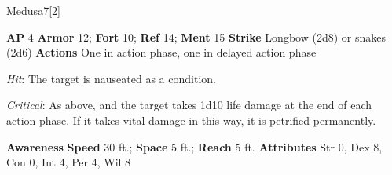 \begin{monsection}{Medusa}{7}[2]
\vspace{-1em}\vspace{-1em}
\begin{spellcontent}
\begin{spelltargetinginfo}
{\textbf{AP} 4}
\pari \textbf{Armor} 12;
\textbf{Fort} 10;
\textbf{Ref} 14;
\textbf{Ment} 15
\pari \textbf{Strike} Longbow  (2d8) or snakes  (2d6)
\pari \textbf{Actions} One in action phase, one in delayed action phase
\end{spelltargetinginfo}
\begin{spelleffects}
\pari
{}
\par
\par \textit{Hit}: The target is nauseated as a condition.
\par \textit{Critical}:
As above, and the target takes 1d10 life damage at the end of each action phase.
If it takes vital damage in this way, it is petrified permanently.
\end{spelleffects}
\end{spellcontent}
\begin{spellsubcontent}
\begin{spellfooter}
\pari \textbf{Awareness} 
\pari \textbf{Speed} 30 ft.;
\textbf{Space} 5 ft.;
\textbf{Reach} 5 ft.
\pari \textbf{Attributes}
Str 0,
Dex 8,
Con 0,
Int 4,
Per 4,
Wil 8
\end{spellfooter}
\end{spellsubcontent}
\end{monsection}
